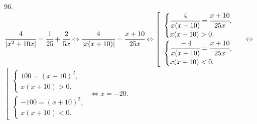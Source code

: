 96. $\cfrac{4}{|x^2+10x|}=\cfrac{1}{25}+\cfrac{2}{5x}\Leftrightarrow\cfrac{4}{|x(x+10)|}=\cfrac{x+10}{25x}\Leftrightarrow
\left[\begin{array}{l}\begin{cases} \cfrac{4}{x(x+10)}=\cfrac{x+10}{25x},\\ x(x+10)>0.\end{cases}\\
\begin{cases} \cfrac{-4}{x(x+10)}=\cfrac{x+10}{25x},\\ x(x+10)<0.\end{cases}\end{array}\right.\Leftrightarrow$\\$
\left[\begin{array}{l}\begin{cases} 100=(x+10)^2,\\ x(x+10)>0.\end{cases}\\
\begin{cases} -100=(x+10)^2,\\ x(x+10)<0.\end{cases}\end{array}\right.\Leftrightarrow x=-20.$\\
